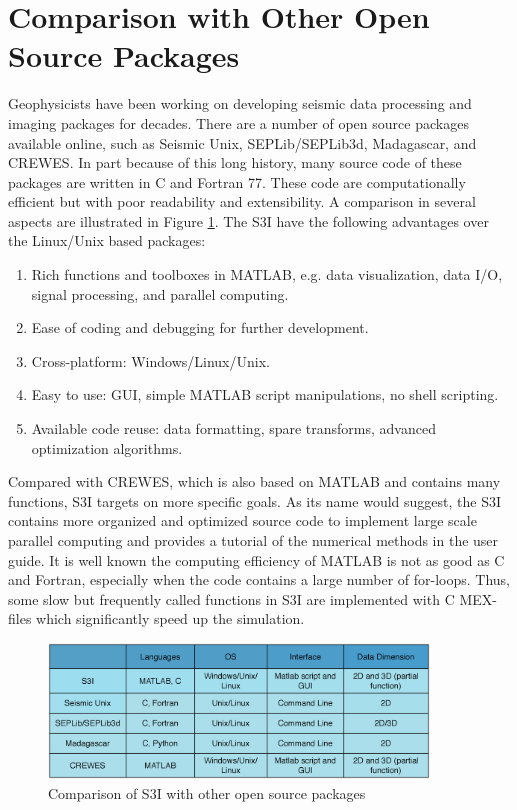 \documentclass[11pt,titlepage]{article}
\theoremstyle{plain}
\theoremstyle{definition}
\theoremstyle{remark}
\numberwithin{equation}{section}
\begin{document}
\appendix
\section{Comparison with Other Open Source Packages}
Geophysicists have been working on developing seismic data processing and imaging packages for decades. There are a number of open source packages available online, such as Seismic Unix, SEPLib/SEPLib3d, Madagascar, and CREWES. In part because of this long history, many source code of these packages are written in C and Fortran 77. These code are computationally efficient but with poor readability and extensibility. A comparison in several aspects are illustrated in Figure \ref{fig:comp}. The S3I have the following advantages over the Linux/Unix based packages: 
\begin{enumerate}
  \item Rich functions and toolboxes in MATLAB, e.g. data visualization, data I/O, signal processing, and parallel computing.
  \item Ease of coding and debugging for further development.
  \item Cross-platform: Windows/Linux/Unix.
  \item Easy to use: GUI, simple MATLAB script manipulations, no shell scripting.
  \item Available code reuse: data formatting, spare transforms, advanced optimization algorithms.
\end{enumerate}
Compared with CREWES, which is also based on MATLAB and contains many functions, S3I targets on more specific goals. As its name would suggest, the S3I contains more organized and optimized source code to implement large scale parallel computing and provides a tutorial of the numerical methods in the user guide. It is well known the computing efficiency of MATLAB is not as good as C and Fortran, especially when the code contains a large number of for-loops. Thus, some slow but frequently called functions in S3I are implemented with C MEX-files which significantly speed up the simulation.  

\begin{figure}
\centering
\includegraphics[width=0.9\textwidth]{Fig/comp.eps}
\caption{Comparison of S3I with other open source packages}
\label{fig:comp}
\end{figure}
\end{document}
